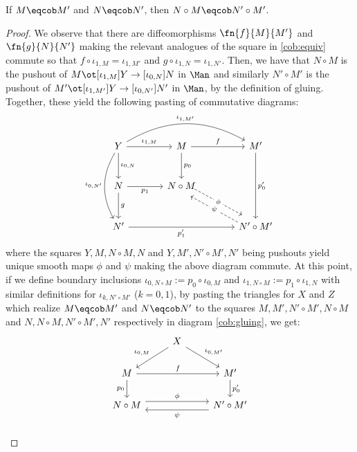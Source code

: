 \begin{lem}\label{cobglue:welldef}
If $M \eqcob M'$ and $N \eqcob N'$, then $N \circ M \eqcob N' \circ M'$.
\end{lem}
\begin{proof}
We observe that there are diffeomorphisms
$\fn{f}{M}{M'}$ and $\fn{g}{N}{N'}$ making the relevant analogues of the square
in \ref{cob:equiv} commute so that $f \circ \iota_{1, M} = \iota_{1, M'}$ and
$g \circ \iota_{1, N} = \iota_{1, N'}$. Then, we have that $N \circ M$ is the
pushout of $M \ot[\iota_{1, M}] Y \to[\iota_{0, N}] N$ in $\Man$ and similarly
$N' \circ M'$ is the pushout of $M' \ot[\iota_{1, M'}] Y \to[\iota_{0, N'}] N'$
in $\Man$, by the definition of gluing. Together, these yield the following
pasting of commutative diagrams:
\begin{equation}\label{cob:gluing}
\begin{tikzcd}[column sep=large, row sep=large]
  Y \arrow{r}{\iota_{1, M}} \arrow{d}[right]{\iota_{0, N}}
      \arrow[rr, bend left, "\iota_{1, M'}"]
      \arrow[dd, bend right, "\iota_{0, N'}" left]
  & M \arrow{r}{f} \arrow{d}{p_0}
  & M' \arrow{dd}{p_0'} \\
  N \arrow{r}[below]{p_1} \arrow{d}[right]{g}
  & N \circ M \arrow[dr, dashed, shift left=1ex, "\phi" description]
  & \\
  N' \arrow{rr}[below]{p_1'}
  &
  & N' \circ M' \arrow[ul, dashed, shift left=1ex, "\psi" description]
\end{tikzcd}
\end{equation}
where the squares $Y, M, N \circ M, N$ and $Y, M', N' \circ M', N'$ being
pushouts yield unique smooth maps $\phi$ and $\psi$ making the above diagram
commute. At this point, if we define boundary inclusions
$\iota_{0, N \circ M} := p_0 \circ \iota_{0, M}$ and
$\iota_{1, N \circ M} := p_1 \circ \iota_{1, N}$ with similar definitions for
$\iota_{k, N' \circ M'}$ ($k = 0, 1$), by pasting the triangles for $X$ and $Z$
which realize $M \eqcob M'$ and $N \eqcob N'$ to the
squares $M, M', N' \circ M', N \circ M$ and $N, N \circ M, N' \circ M', N'$
respectively in diagram \ref{cob:gluing}, we get:
\[
\begin{tikzcd}
  & X \arrow{dl}[above,xshift=-2.5ex]{\iota_{0, M}} \arrow[dr, "\iota_{0, M'}"]
    & \\
  M \arrow[rr, "f"] \arrow[d, "p_0" left] & & M' \arrow[d, "p_0'" right]\\
  N \circ M \arrow[rr, shift left=1ex, "\phi"] &
    & N' \circ M' \arrow[ll, shift left=1ex, "\psi"]\\

\end{tikzcd}\]
\end{proof}
